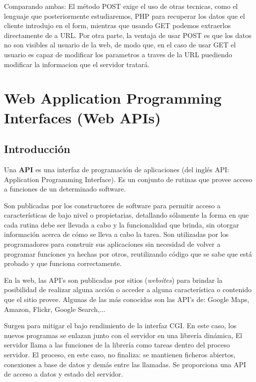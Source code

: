\documentclass{apuntes}
\begin{document}
Comparando ambas: El método POST exige el uso de otras tecnicas, como el lenguaje que posteriormente estudiaremos, PHP para recuperar los datos que el cliente introdujo en el form, mientras que usando GET podemos extraerlos directamente de a URL. Por otra parte, la ventaja de usar POST es que los datos no son visibles al usuario de la web, de modo que, en el caso de usar GET el usuario es capaz de modificar los parametros a traves de la URL puediendo modificar la informacion que el servidor tratará.

\section{Web Application Programming Interfaces (Web APIs)}
\subsection{Introducción}
\begin{defn}[API]
Una \textbf{API} es una interfaz de programación de aplicaciones (del inglés API: Application Programming Interface). Es un conjunto de rutinas que provee acceso a funciones de un determinado software.
\end{defn}

Son publicadas por los constructores de software para permitir acceso a características de bajo nivel o propietarias, detallando sólamente la forma en que cada rutina debe ser llevada a cabo y la funcionalidad que brinda, sin otorgar información acerca de cómo se lleva a cabo la tarea. Son utilizadas por los programadores para construir sus aplicaciones sin necesidad de volver a programar funciones ya hechas por otros, reutilizando código que se sabe que está probado y que funciona correctamente.

En la web, las API's son publicadas por sitios (\emph{websites}) para brindar la posibilidad de realizar alguna acción o acceder a alguna característica o contenido que el sitio provee. Algunas de las más conocidas son las API's de: Google Maps, Amazon, Flickr, Google Search,...

Surgen para mitigar el bajo rendimiento de la interfaz CGI. En este caso, los nuevos programas se enlazan junto con el servidor en una librería dinámica, El servidor llama a las funciones de la librería como tareas dentro del proceso servidor. El proceso, en este caso, no finaliza: se mantienen ficheros abiertos, conexiones a base de datos y demás entre las llamadas. Se proporciona una API de acceso a datos y estado del servidor.
\end{document}
